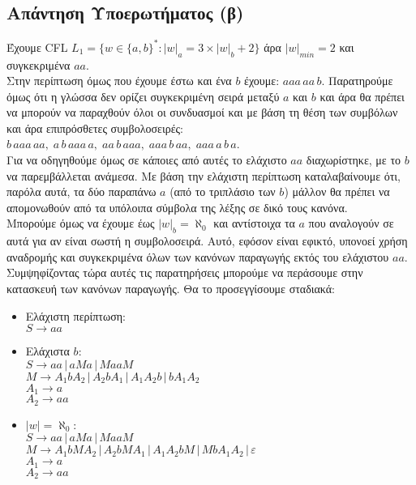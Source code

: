 \subsection{Απάντηση Υποερωτήματος (β)}
\label{ssec:Solution_1.2}
\doublespacing

Έχουμε CFL
$ L_1 = \{w \in \{a, b\}^* : |w|_a = 3 \times |w|_b + 2 \}$
άρα $\vert w \vert_{min} = 2$ και συγκεκριμένα $aa$.\\
Στην περίπτωση όμως που έχουμε έστω και ένα $b$ έχουμε:
$aaa\,aa\,b$.
Παρατηρούμε όμως ότι η γλώσσα δεν ορίζει συγκεκριμένη σειρά μεταξύ $a$ και
$b$ και άρα θα πρέπει να μπορούν να παραχθούν όλοι οι συνδυασμοί και με βάση τη θέση των συμβόλων και άρα
επιπρόσθετες συμβολοσειρές: $b\,aaa\,aa,\; a\,b\,aaa\,a,\; aa\,b\,aaa,\; aaa\,b\,aa,\;
aaa\,a\,b\,a$.\\
Για να οδηγηθούμε όμως σε κάποιες από αυτές το ελάχιστο $aa$ διαχωρίστηκε, με το $b$ να παρεμβάλλεται ανάμεσα.
Με βάση την ελάχιστη περίπτωση καταλαβαίνουμε ότι, παρόλα αυτά, τα δύο παραπάνω $a$ (από το τριπλάσιο των $b$)
μάλλον θα πρέπει να απομονωθούν από τα υπόλοιπα σύμβολα της λέξης σε δικό τους κανόνα.\\
Μπορούμε όμως να έχουμε έως $|w|_b = \aleph_0$ και αντίστοιχα τα $a$ που αναλογούν σε αυτά για αν
είναι σωστή η συμβολοσειρά. Αυτό, εφόσον είναι εφικτό, υπονοεί χρήση αναδρομής και συγκεκριμένα όλων των κανόνων
παραγωγής εκτός του ελάχιστου $aa$.\\
Συμψηφίζοντας τώρα αυτές τις παρατηρήσεις μπορούμε να περάσουμε στην κατασκευή των κανόνων παραγωγής. Θα το
προσεγγίσουμε σταδιακά:
\begin{itemize}
	\itemsep0em

	\item Ελάχιστη περίπτωση:\\
	$S \rightarrow aa$

	\item Ελάχιστα $b$:\\
	$S \rightarrow aa \,|\, aMa \,|\, MaaM$\\
	$M \rightarrow A_1 b A_2 \,|\, A_2 b A_1 \,|\, A_1 A_2 b \,|\, b A_1 A_2$\\
	$A_1 \rightarrow a$\\
	$A_2 \rightarrow aa$

	\item $|w| = \aleph_0$:\\
	$S \rightarrow aa \,|\, aMa \,|\, MaaM$\\
	$M \rightarrow A_1 bM A_2 \,|\, A_2 bM A_1 \,|\, A_1 A_2 bM \,|\, Mb A_1 A_2 \,|\, ε$\\
	$A_1 \rightarrow a$\\
	$A_2 \rightarrow aa$
\end{itemize}

